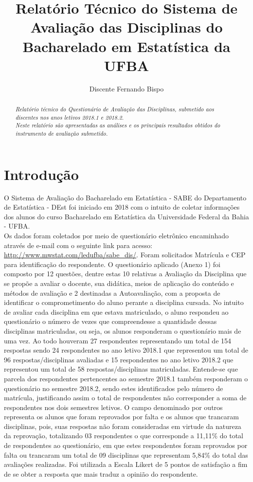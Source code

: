 \documentclass[12pt,a4paper]{article}
\author{Discente Fernando Bispo}
\title{\textbf{Relatório Técnico do Sistema de Avaliação das Disciplinas do Bacharelado em Estatística da UFBA}}
\date{}
\begin{document}
\maketitle

\begin{abstract} %
\textit{
Relatório técnico do Questionário de Avaliação das Disciplinas, submetido aos discentes nos anos letivos 2018.1 e 2018.2.\\
Neste relatório são apresentadas as análises e os principais resultados obtidos do instrumento de avaliação submetido.
}
\end{abstract}

\section{Introdução}

O Sistema de Avaliação do Bacharelado em Estatística - SABE do Departamento de Estatística - DEst foi iniciado em 2018 com o intuito de coletar informações dos alunos do curso Bacharelado em Estatística da Universidade Federal da Bahia - UFBA.\\
 Os dados foram coletados por meio de questionário eletrônico encaminhado através de e-mail com o seguinte link para acesso: \url{http://www.mwstat.com/ledufba/sabe_dis/}. Foram solicitados Matrícula e CEP para identificação do respondente.
O questionário aplicado (Anexo 1) foi composto por 12 questões, dentre estas 10 relativas a Avaliação da Disciplina que se propõe a avaliar o docente, sua didática, meios de aplicação do conteúdo e métodos de avaliação e 2 destinadas a Autoavaliação, com a proposta de identificar o comprometimento do aluno perante a disciplina cursada. 
No intuito de avaliar cada disciplina em que estava matriculado, o aluno respondeu ao questionário o número de vezes que compreendesse a quantidade dessas disciplinas matriculadas, ou seja, os alunos responderam o questionário mais de uma vez. Ao todo houveram 27 respondentes representando um total de 154 respostas sendo 24 respondentes no ano letivo 2018.1 que representou um total de 96 respostas/disciplinas avaliadas e 15 respondentes no ano letivo 2018.2 que representou um total de 58 respostas/disciplinas matriculadas. Entende-se que parcela dos respondentes pertencentes ao semestre 2018.1 também responderam o questionário no semestre 2018.2, sendo estes identificados pelo número de matrícula, justificando assim o total de respondentes não corresponder a soma de respondentes nos dois semestres letivos.
O campo denominado por outros representa os alunos que foram reprovados por falta e os alunos que trancaram disciplinas, pois, suas respostas não foram consideradas em virtude da natureza da reprovação, totalizando 03 respondentes o que corresponde a 11,11\% do total de respondentes ao questionário, em que estes respondentes foram reprovados por falta ou trancaram um total de 09 disciplinas que representam 5,84\% do total das avaliações realizadas.
Foi utilizada a Escala Likert de 5 pontos de satisfação a fim de se obter a resposta que mais traduz a opinião do respondente.
\end{document}
